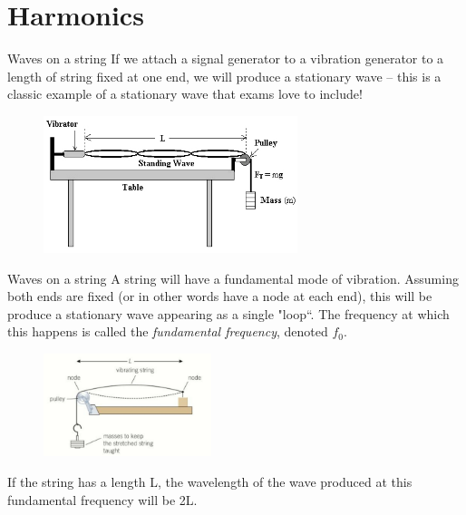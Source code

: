 \documentclass[../Main.tex]{subfiles}
\begin{document}
\author{Harmonics} %
\date{Year 1 Topic 19} %

\section{Harmonics} %

\begin{frame}{Waves on a string}
    If we attach a signal generator to a vibration generator to a length of string fixed at one end, we will produce a stationary wave -- this is a classic example of a stationary wave that exams love to include! 
    
    \begin{figure}
        \centering
        \includegraphics[height=4cm]{Waves_Images/vibrationgenerator.jpg}
    \end{figure}
\end{frame}

\begin{frame}{Waves on a string}
A string will have a fundamental mode of vibration. Assuming both ends are fixed (or in other words have a node at each end), this will be produce a stationary wave appearing as a single "loop``. The frequency at which this happens is called the \emph{fundamental frequency}, denoted $f_0$.

\begin{figure}
    \centering
    \includegraphics[height=3cm]{Waves_Images/1stharmonic.jpg}
\end{figure}
\pause
If the string has a length L, the wavelength of the wave produced at this fundamental frequency will be 2L. 
\end{frame}
\end{document}
